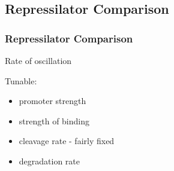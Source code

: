 \documentclass{beamer}
\begin{document}
\begin{frame}
\begin{columns}[T]
\begin{column}{0.4\textwidth}


    \end{column}    
  \end{columns}

\end{frame}

\subsection{Repressilator Comparison}
\begin{frame}
\frametitle{Repressilator Comparison}

Rate of oscillation 

Tunable:
\begin{itemize}
 \item promoter strength

 \item  strength of binding

 \item  cleavage rate - fairly fixed 
 
 \item degradation rate

\end{itemize}


\end{frame}

\end{document}
